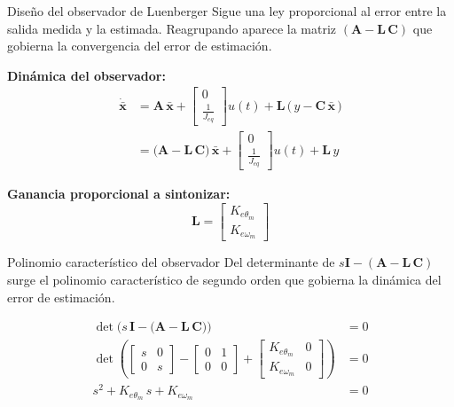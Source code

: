 \documentclass[aspectratio=169,t]{beamer}
\begin{document}
\begin{frame}{Diseño del observador de Luenberger}
{\small\color{uncGray}Sigue una ley proporcional al error entre la salida medida y la estimada. Reagrupando aparece la matriz $(\bm{A}-\bm{L}\,\bm{C})$ que gobierna la convergencia del error de estimación.}\par
\vspace{3mm}

\textbf{Dinámica del observador:}
\begin{align*}
\dot{\bar{\bm{x}}} &= \bm{A}\,\bar{\bm{x}} + \begin{bmatrix} 0 \\ \tfrac{1}{J_{eq}} \end{bmatrix} u(t) + \bm{L}\,\big(\,y - \bm{C}\,\bar{\bm{x}}\,\big) \\[4pt]
&= \big(\bm{A} - \bm{L}\,\bm{C}\big)\,\bar{\bm{x}} + \begin{bmatrix} 0 \\ \tfrac{1}{J_{eq}} \end{bmatrix} u(t) + \bm{L}\,y
\end{align*}

\textbf{Ganancia proporcional a sintonizar:}
\begin{equation*}
\bm{L} = \begin{bmatrix} K_{e\theta_m} \\ K_{e\omega_m} \end{bmatrix}
\end{equation*}
\end{frame}

\begin{frame}{Polinomio característico del observador}
{\small\color{uncGray}Del determinante de $s\bm{I} - (\bm{A} - \bm{L}\,\bm{C})$ surge el polinomio característico de segundo orden que gobierna la dinámica del error de estimación.}\par
\vspace{4mm}

\begin{align*}
\det\!\Big(s\,\bm{I} - \big(\bm{A} - \bm{L}\,\bm{C}\big)\Big) &= 0 \\[6pt]
\det\!\left(
\begin{bmatrix} s & 0 \\ 0 & s \end{bmatrix}
- \begin{bmatrix} 0 & 1 \\ 0 & 0 \end{bmatrix}
+ \begin{bmatrix} K_{e\theta_m} & 0 \\ K_{e\omega_m} & 0 \end{bmatrix}
\right) &= 0 \\[6pt]
s^{2} + K_{e\theta_m}\,s + K_{e\omega_m} &= 0
\end{align*}
\end{frame}
\end{document}
